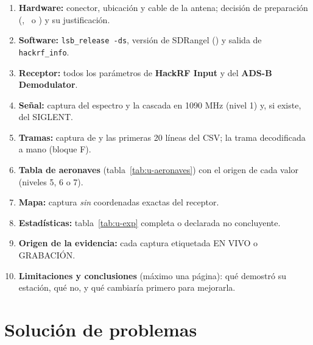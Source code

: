 \begin{entregable}[Laboratorio 02]
\begin{enumerate}
  \item \textbf{Hardware:} conector, ubicación y cable de la antena; decisión de preparación (\PASS, \COND\ o \BLOQ) y su justificación.
  \item \textbf{Software:} \texttt{lsb\_release -ds}, versión de SDRangel () y salida de \texttt{hackrf\_info}.
  \item \textbf{Receptor:} todos los parámetros de \textbf{HackRF Input} y del \textbf{ADS-B Demodulator}.
  \item \textbf{Señal:} captura del espectro y la cascada en 1090 MHz (nivel 1) y, si existe, del SIGLENT.
  \item \textbf{Tramas:} captura de  y las primeras 20 líneas del CSV; la trama decodificada a mano (bloque F).
  \item \textbf{Tabla de aeronaves} (tabla~\ref{tab:u-aeronaves}) con el origen de cada valor (niveles 5, 6 o 7).
  \item \textbf{Mapa:} captura \emph{sin} coordenadas exactas del receptor.
  \item \textbf{Estadísticas:} tabla~\ref{tab:u-exp} completa o declarada no concluyente.
  \item \textbf{Origen de la evidencia:} cada captura etiquetada EN VIVO o GRABACIÓN.
  \item \textbf{Limitaciones y conclusiones} (máximo una página): qué demostró su estación, qué no, y qué cambiaría primero para mejorarla.
\end{enumerate}
\end{entregable}

\section{Solución de problemas}
\label{sec:u-diag2}

